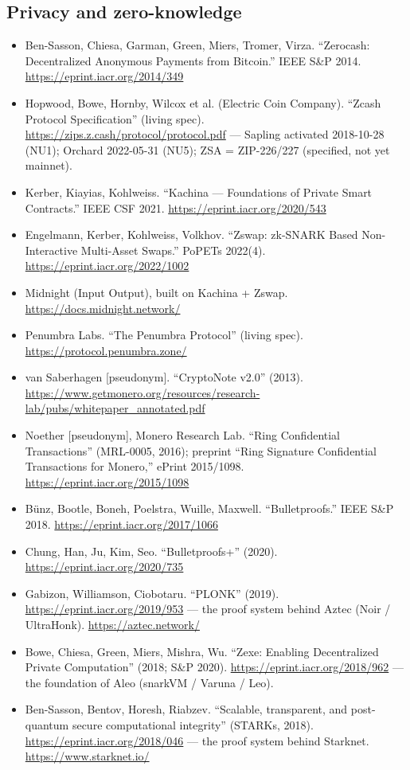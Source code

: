 \documentclass[11pt,a4paper]{article}
\begin{document}
\subsection*{Privacy and zero-knowledge}
\begin{itemize}
    \item Ben-Sasson, Chiesa, Garman, Green, Miers, Tromer, Virza. ``Zerocash: Decentralized Anonymous Payments from Bitcoin.'' IEEE S\&P 2014. \url{https://eprint.iacr.org/2014/349}
    \item Hopwood, Bowe, Hornby, Wilcox et al. (Electric Coin Company). ``Zcash Protocol Specification'' (living spec). \url{https://zips.z.cash/protocol/protocol.pdf} --- Sapling activated 2018-10-28 (NU1); Orchard 2022-05-31 (NU5); ZSA = ZIP-226/227 (specified, not yet mainnet).
    \item Kerber, Kiayias, Kohlweiss. ``Kachina --- Foundations of Private Smart Contracts.'' IEEE CSF 2021. \url{https://eprint.iacr.org/2020/543}
    \item Engelmann, Kerber, Kohlweiss, Volkhov. ``Zswap: zk-SNARK Based Non-Interactive Multi-Asset Swaps.'' PoPETs 2022(4). \url{https://eprint.iacr.org/2022/1002}
    \item Midnight (Input Output), built on Kachina + Zswap. \url{https://docs.midnight.network/}
    \item Penumbra Labs. ``The Penumbra Protocol'' (living spec). \url{https://protocol.penumbra.zone/}
    \item van Saberhagen [pseudonym]. ``CryptoNote v2.0'' (2013). \url{https://www.getmonero.org/resources/research-lab/pubs/whitepaper_annotated.pdf}
    \item Noether [pseudonym], Monero Research Lab. ``Ring Confidential Transactions'' (MRL-0005, 2016); preprint ``Ring Signature Confidential Transactions for Monero,'' ePrint 2015/1098. \url{https://eprint.iacr.org/2015/1098}
    \item Bünz, Bootle, Boneh, Poelstra, Wuille, Maxwell. ``Bulletproofs.'' IEEE S\&P 2018. \url{https://eprint.iacr.org/2017/1066}
    \item Chung, Han, Ju, Kim, Seo. ``Bulletproofs+'' (2020). \url{https://eprint.iacr.org/2020/735}
    \item Gabizon, Williamson, Ciobotaru. ``PLONK'' (2019). \url{https://eprint.iacr.org/2019/953} --- the proof system behind Aztec (Noir / UltraHonk). \url{https://aztec.network/}
    \item Bowe, Chiesa, Green, Miers, Mishra, Wu. ``Zexe: Enabling Decentralized Private Computation'' (2018; S\&P 2020). \url{https://eprint.iacr.org/2018/962} --- the foundation of Aleo (snarkVM / Varuna / Leo).
    \item Ben-Sasson, Bentov, Horesh, Riabzev. ``Scalable, transparent, and post-quantum secure computational integrity'' (STARKs, 2018). \url{https://eprint.iacr.org/2018/046} --- the proof system behind Starknet. \url{https://www.starknet.io/}
\end{itemize}
\end{document}
